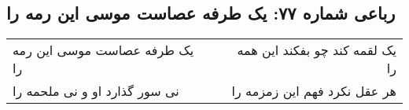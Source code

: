 \begin{center}
\section*{رباعی شماره ۷۷: یک طرفه عصاست موسی این رمه را}
\label{sec:0077}
\begin{longtable}{l p{0.5cm} r}
یک طرفه عصاست موسی این رمه را
&&
یک لقمه کند چو بفکند این همه را
\\
نی سور گذارد او و نی ملحمه را
&&
هر عقل نکرد فهم این زمزمه را
\\
\end{longtable}
\end{center}
